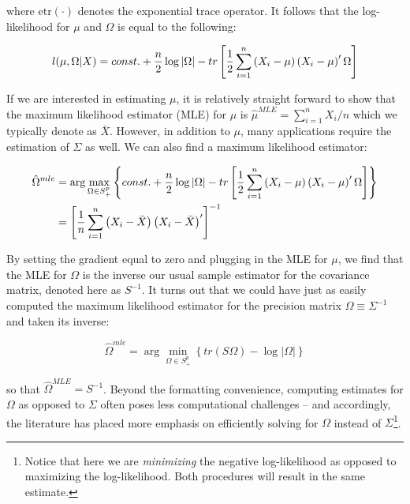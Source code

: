 \documentclass[11pt,]{report}
\begin{document}
where \(\mbox{etr}\left( \cdot \right)\) denotes the exponential trace operator. It follows that the log-likelihood for \(\mu\) and \(\Omega\) is equal to the following:

\begin{equation}
  l(\mu, \Omega | X) = const. + \frac{n}{2}\log\left| \Omega \right| - tr\left[ \frac{1}{2}\sum_{i = 1}^{n}\left(X_{i} - \mu \right)\left(X_{i} - \mu \right)'\Omega \right]
\label{eq:normalloglik}\notag
\end{equation}

If we are interested in estimating \(\mu\), it is relatively straight forward to show that the maximum likelihood estimator (MLE) for \(\mu\) is \(\hat{\mu}^{MLE} = \sum_{i = 1}^{n}X_{i}/n\) which we typically denote as \(\bar{X}\). However, in addition to \(\mu\), many applications require the estimation of \(\Sigma\) as well. We can also find a maximum likelihood estimator:

\begin{equation}
\begin{split}
\hat{\Omega}^{mle} &= \arg\max_{\Omega \in S_{+}^{p}}\left\{ const. + \frac{n}{2}\log\left| \Omega \right| - tr\left[ \frac{1}{2}\sum_{i = 1}^{n}\left(X_{i} - \mu \right)\left(X_{i} - \mu \right)'\Omega \right] \right\} \\
  &= \left[ \frac{1}{n}\sum_{i = 1}^{n}\left(X_{i} - \bar{X} \right)\left(X_{i} - \bar{X} \right)' \right]^{-1}
\end{split}
\label{eq:omegamle}\notag
\end{equation}

By setting the gradient equal to zero and plugging in the MLE for \(\mu\), we find that the MLE for \(\Omega\) is the inverse our usual sample estimator for the covariance matrix, denoted here as \(S^{-1}\). It turns out that we could have just as easily computed the maximum likelihood estimator for the precision matrix \(\Omega \equiv \Sigma^{-1}\) and taken its inverse:

\begin{equation}
\hat{\Omega}^{mle} = \arg\min_{\Omega \in S_{+}^{p}}\left\{ tr\left(S\Omega\right) - \log\left|\Omega\right| \right\}
\label{eq:omegamlesimple}
\end{equation}

so that \(\hat{\Omega}^{MLE} = S^{-1}\). Beyond the formatting convenience, computing estimates for \(\Omega\) as opposed to \(\Sigma\) often poses less computational challenges -- and accordingly, the literature has placed more emphasis on efficiently solving for \(\Omega\) instead of \(\Sigma\)\footnote{Notice that here we are \emph{minimizing} the negative log-likelihood as opposed to maximizing the log-likelihood. Both procedures will result in the same estimate.}.
\end{document}
